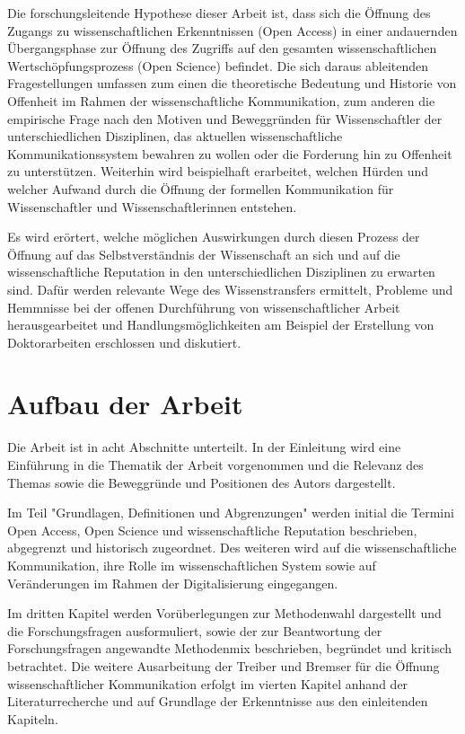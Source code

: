 Die forschungsleitende Hypothese dieser Arbeit ist, dass sich die Öffnung des Zugangs zu wissenschaftlichen Erkenntnissen (Open Access) in einer andauernden Übergangsphase zur Öffnung des Zugriffs auf den gesamten wissenschaftlichen Wertschöpfungsprozess (Open Science) befindet. Die sich daraus ableitenden Fragestellungen umfassen zum einen die theoretische Bedeutung und Historie von Offenheit im Rahmen der wissenschaftliche Kommunikation, zum anderen die empirische Frage nach den Motiven und Beweggründen für Wissenschaftler der unterschiedlichen Disziplinen, das aktuellen wissenschaftliche Kommunikationssystem bewahren zu wollen oder die Forderung hin zu Offenheit zu unterstützen. Weiterhin wird beispielhaft erarbeitet, welchen Hürden und welcher Aufwand durch die Öffnung der formellen Kommunikation für Wissenschaftler und Wissenschaftlerinnen entstehen.

Es wird erörtert, welche möglichen Auswirkungen durch diesen Prozess der Öffnung auf das Selbstverständnis der Wissenschaft an sich und auf die wissenschaftliche Reputation in den unterschiedlichen Disziplinen zu erwarten sind. Dafür werden relevante Wege des Wissenstransfers ermittelt, Probleme und Hemmnisse bei der offenen Durchführung von wissenschaftlicher Arbeit herausgearbeitet und Handlungsmöglichkeiten am Beispiel der Erstellung von Doktorarbeiten erschlossen und diskutiert.

\section{Aufbau der Arbeit}

Die Arbeit ist in acht Abschnitte unterteilt. In der Einleitung wird eine Einführung in die Thematik der Arbeit vorgenommen und die Relevanz des Themas sowie die Beweggründe und Positionen des Autors dargestellt.

Im Teil "Grundlagen, Definitionen und Abgrenzungen" werden initial die Termini Open Access, Open Science und wissenschaftliche Reputation beschrieben, abgegrenzt und historisch zugeordnet. Des weiteren wird auf die wissenschaftliche Kommunikation, ihre Rolle im wissenschaftlichen System sowie auf Veränderungen im Rahmen der Digitalisierung eingegangen.

Im dritten Kapitel werden Vorüberlegungen zur Methodenwahl dargestellt und die Forschungsfragen ausformuliert, sowie der zur Beantwortung der Forschungsfragen angewandte Methodenmix beschrieben, begründet und kritisch betrachtet. Die weitere Ausarbeitung der Treiber und Bremser für die Öffnung wissenschaftlicher Kommunikation erfolgt im vierten Kapitel anhand der Literaturrecherche und auf Grundlage der Erkenntnisse aus den einleitenden Kapiteln.

